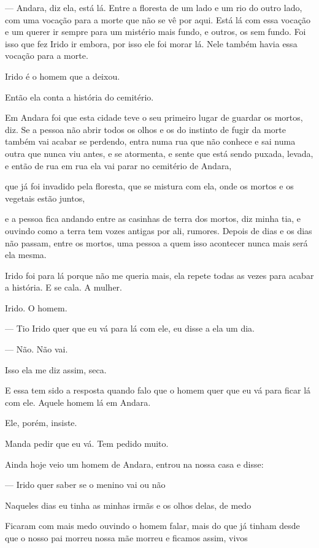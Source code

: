 --- Andara, diz ela, está lá. Entre a floresta de um lado e um rio do
outro lado, com uma vocação para a morte que não se vê por aqui. Está lá
com essa vocação e um querer ir sempre para um mistério mais fundo, e
outros, os sem fundo. Foi isso que fez Irido ir embora, por isso ele foi
morar lá. Nele também havia essa vocação para a morte.

Irido é o homem que a deixou.

Então ela conta a história do cemitério.

Em Andara foi que esta cidade teve o seu primeiro lugar de guardar os
mortos, diz. Se a pessoa não abrir todos os olhos e os do instinto de
fugir da morte também vai acabar se perdendo, entra numa rua que não
conhece e sai numa outra que nunca viu antes, e se atormenta, e sente
que está sendo puxada, levada, e então de rua em rua ela vai parar no
cemitério de Andara,

que já foi invadido pela floresta, que se mistura com ela, onde os
mortos e os vegetais estão juntos,

e a pessoa fica andando entre as casinhas de terra dos mortos, diz minha
tia, e ouvindo como a terra tem vozes antigas por ali, rumores. Depois
de dias e os dias não passam, entre os mortos, uma pessoa a quem isso
acontecer nunca mais será ela mesma.

Irido foi para lá porque não me queria mais, ela repete todas as vezes
para acabar a história. E se cala. A mulher.

Irido. O homem.

--- Tio Irido quer que eu vá para lá com ele, eu disse a ela um dia.

--- Não. Não vai.

Isso ela me diz assim, seca.

E essa tem sido a resposta quando falo que o homem quer que eu vá para
ficar lá com ele. Aquele homem lá em Andara.

Ele, porém, insiste.

Manda pedir que eu vá. Tem pedido muito.

Ainda hoje veio um homem de Andara, entrou na nossa casa e disse:

--- Irido quer saber se o menino vai ou não

Naqueles dias eu tinha as minhas irmãs e os olhos delas, de medo

Ficaram com mais medo ouvindo o homem falar, mais do que já tinham desde
que o nosso pai morreu nossa mãe morreu e ficamos assim, vivos

